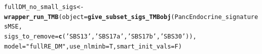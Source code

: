 \documentclass{article}\usepackage[]{graphicx}\usepackage[]{xcolor}
\makeatletter
\newcommand{\hlstr}[1]{\textcolor[rgb]{0.192,0.494,0.8}{#1}}%
\newcommand{\hlstd}[1]{\textcolor[rgb]{0.345,0.345,0.345}{#1}}%
\newcommand{\hlkwb}[1]{\textcolor[rgb]{0.69,0.353,0.396}{#1}}%
\newcommand{\hlkwc}[1]{\textcolor[rgb]{0.333,0.667,0.333}{#1}}%
\newcommand{\hlkwd}[1]{\textcolor[rgb]{0.737,0.353,0.396}{\textbf{#1}}}%
\newenvironment{kframe}{%
 \def\at@end@of@kframe{}%
 \ifinner\ifhmode%
  \def\at@end@of@kframe{\end{minipage}}%
  \begin{minipage}{\columnwidth}%
 \fi\fi%
 \def\FrameCommand##1{\hskip\@totalleftmargin \hskip-\fboxsep
 \colorbox{shadecolor}{##1}\hskip-\fboxsep
     \hskip-\linewidth \hskip-\@totalleftmargin \hskip\columnwidth}%
 \MakeFramed {\advance\hsize-\width
   \@totalleftmargin\z@ \linewidth\hsize
   \@setminipage}}%
 {\par\unskip\endMakeFramed%
 \at@end@of@kframe}
\newenvironment{knitrout}{}{} %
\makeatother
\begin{document}
\begin{knitrout}
\color{fgcolor}\begin{kframe}
\begin{alltt}
\hlstd{fullDM_no_small_sigs} \hlkwb{<-} \hlkwd{wrapper_run_TMB}\hlstd{(}\hlkwc{object} \hlstd{=} \hlkwd{give_subset_sigs_TMBobj}\hlstd{(PancEndocrine_signaturesMSE,}
                           \hlkwc{sigs_to_remove} \hlstd{=} \hlkwd{c}\hlstd{(}\hlstr{'SBS13'}\hlstd{,} \hlstr{'SBS17a'}\hlstd{,} \hlstr{'SBS17b'}\hlstd{,} \hlstr{'SBS30'}\hlstd{)),}
                                        \hlkwc{model} \hlstd{=} \hlstr{"fullRE_DM"}\hlstd{,} \hlkwc{use_nlminb}\hlstd{=T,} \hlkwc{smart_init_vals}\hlstd{=F)}
\end{alltt}


{\ttfamily\noindent\bfseries{}}\end{kframe}
\end{knitrout}
\end{document}
